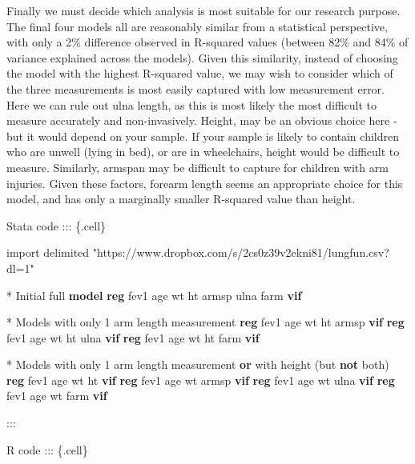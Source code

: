 \documentclass[
  letterpaper,
  DIV=11,
  numbers=noendperiod]{scrreprt}
\newenvironment{Shaded}{\begin{snugshade}}{\end{snugshade}}
\newcommand{\FunctionTok}[1]{\textcolor[rgb]{0.28,0.35,0.67}{#1}}
\newcommand{\KeywordTok}[1]{\textcolor[rgb]{0.00,0.23,0.31}{\textbf{#1}}}
\newcommand{\NormalTok}[1]{\textcolor[rgb]{0.00,0.23,0.31}{#1}}
\newcommand{\StringTok}[1]{\textcolor[rgb]{0.13,0.47,0.30}{#1}}
\begin{document}
Finally we must decide which analysis is most suitable for our research
purpose. The final four models all are reasonably similar from a
statistical perspective, with only a 2\% difference observed in
R-squared values (between 82\% and 84\% of variance explained across the
models). Given this similarity, instead of choosing the model with the
highest R-squared value, we may wish to consider which of the three
measurements is most easily captured with low measurement error. Here we
can rule out ulna length, as this is most likely the most difficult to
measure accurately and non-invasively. Height, may be an obvious choice
here - but it would depend on your sample. If your sample is likely to
contain children who are unwell (lying in bed), or are in wheelchairs,
height would be difficult to measure. Similarly, armspan may be
difficult to capture for children with arm injuries. Given these
factors, forearm length seems an appropriate choice for this model, and
has only a marginally smaller R-squared value than height.

Stata code ::: \{.cell\}

\begin{Shaded}
\begin{Highlighting}[]
\NormalTok{import delimited }\StringTok{"https://www.dropbox.com/s/2cs0z39v2ekni81/lungfun.csv?dl=1"}

\NormalTok{* Initial full }\KeywordTok{model}
\KeywordTok{reg}\NormalTok{ fev1 age wt ht armsp ulna farm}
\KeywordTok{vif}

\NormalTok{* Models with only 1 arm }\FunctionTok{length}\NormalTok{ measurement}
\KeywordTok{reg}\NormalTok{ fev1 age wt ht armsp}
\KeywordTok{vif}
\KeywordTok{reg}\NormalTok{ fev1 age wt ht ulna}
\KeywordTok{vif}
\KeywordTok{reg}\NormalTok{ fev1 age wt ht farm}
\KeywordTok{vif}

\NormalTok{* Models with only 1 arm }\FunctionTok{length}\NormalTok{ measurement }\KeywordTok{or}\NormalTok{ with height (but }\KeywordTok{not}\NormalTok{ both)}
\KeywordTok{reg}\NormalTok{ fev1 age wt ht}
\KeywordTok{vif}
\KeywordTok{reg}\NormalTok{ fev1 age wt armsp}
\KeywordTok{vif}
\KeywordTok{reg}\NormalTok{ fev1 age wt ulna}
\KeywordTok{vif}
\KeywordTok{reg}\NormalTok{ fev1 age wt farm}
\KeywordTok{vif}
\end{Highlighting}
\end{Shaded}

:::

R code ::: \{.cell\}
\end{document}

